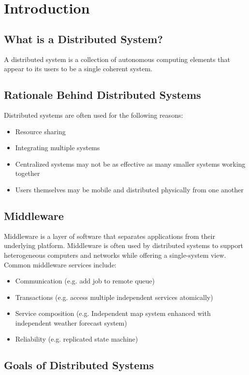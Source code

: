 \documentclass[12pt,titlepage]{article}
\let\stdsection\section
\renewcommand\section{\clearpage\stdsection}
\begin{document}
  \section{Introduction}
    \subsection{What is a Distributed System?}
      A distributed system is a collection of autonomous computing elements that appear to its users to be a single coherent system.

    \subsection{Rationale Behind Distributed Systems}
      Distributed systems are often used for the following reasons:
      \begin{itemize}
        \item Resource sharing
        \item Integrating multiple systems
        \item Centralized systems may not be as effective as many smaller systems working together
        \item Users themselves may be mobile and distributed physically from one another
      \end{itemize}

    \subsection{Middleware}
      Middleware is a layer of software that separates applications from their underlying platform. Middleware is often used by distributed
      systems to support heterogeneous computers and networks while offering a single-system view. Common middleware services include:
      \begin{itemize}
        \item Communication (e.g. add job to remote queue)
        \item Transactions (e.g. access multiple independent services atomically)
        \item Service composition (e.g. Independent map system enhanced with independent weather forecast system)
        \item Reliability (e.g. replicated state machine)
      \end{itemize}

    \subsection{Goals of Distributed Systems}
\end{document}
